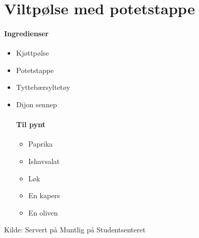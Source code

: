 \section{﻿Viltpølse med potetstappe}


\paragraph{Ingredienser}
\begin{itemize}[noitemsep]
	\item Kjøttpølse
	\item Potetstappe
	\item Tyttebærsyltetøy
	\item Dijon sennep
	      \paragraph{Til pynt}
	      \begin{itemize}[noitemsep]
	      	\item Paprika
	      	\item Ishavsalat
	      	\item Løk
	      	\item En kapers
	      	\item En oliven
	      \end{itemize}
\end{itemize}

Kilde: Servert på Muntlig på Studentsenteret
